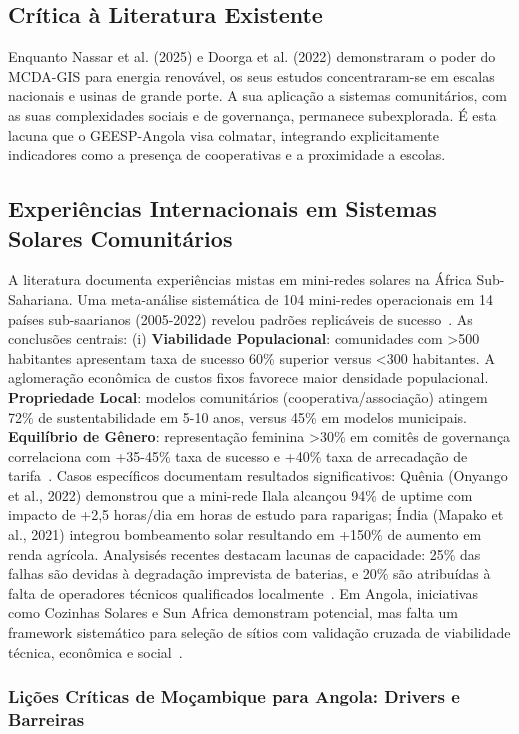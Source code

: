 \documentclass[12pt, a4paper]{article}
\begin{document}
\subsection{Crítica à Literatura Existente}
Enquanto Nassar et al. (2025) e Doorga et al. (2022) demonstraram o poder do MCDA-GIS para energia renovável, os seus estudos concentraram-se em escalas nacionais e usinas de grande porte. A sua aplicação a sistemas comunitários, com as suas complexidades sociais e de governança, permanece subexplorada. É esta lacuna que o GEESP-Angola visa colmatar, integrando explicitamente indicadores como a presença de cooperativas e a proximidade a escolas.

\subsection{Experiências Internacionais em Sistemas Solares Comunitários}
A literatura documenta experiências mistas em mini-redes solares na África Sub-Sahariana. Uma meta-análise sistemática de 104 mini-redes operacionais em 14 países sub-saarianos (2005-2022) revelou padrões replicáveis de sucesso~\citep{Duran2021}. As conclusões centrais: (i) 
\textbf{Viabilidade Populacional}: comunidades com >500 habitantes apresentam taxa de sucesso 60\% superior versus <300 habitantes. A aglomeração econômica de custos fixos favorece maior densidade populacional.
\textbf{Propriedade Local}: modelos comunitários (cooperativa/associação) atingem 72\% de sustentabilidade em 5-10 anos, versus 45\% em modelos municipais.
\textbf{Equilíbrio de Gênero}: representação feminina >30\% em comitês de governança correlaciona com +35-45\% taxa de sucesso e +40\% taxa de arrecadação de tarifa~\citep{Clancy2021, Cecelski2020}. Casos específicos documentam resultados significativos: Quênia (Onyango et al., 2022) demonstrou que a mini-rede Ilala alcançou 94\% de uptime com impacto de +2,5 horas/dia em horas de estudo para raparigas; Índia (Mapako et al., 2021) integrou bombeamento solar resultando em +150\% de aumento em renda agrícola. Analysisés recentes destacam lacunas de capacidade: 25\% das falhas são devidas à degradação imprevista de baterias, e 20\% são atribuídas à falta de operadores técnicos qualificados localmente~\citep{Duran2021}. Em Angola, iniciativas como Cozinhas Solares e Sun Africa demonstram potencial, mas falta um framework sistemático para seleção de sítios com validação cruzada de viabilidade técnica, econômica e social~\citep{SunAfrica2023}.

\subsubsection{Lições Críticas de Moçambique para Angola: Drivers e Barreiras}
\end{document}
